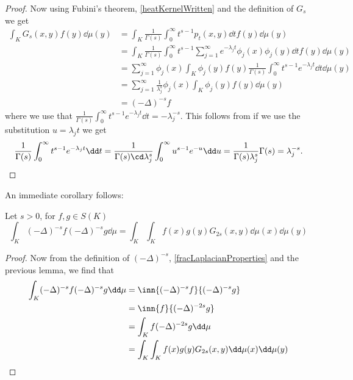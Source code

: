 \begin{proof}
	Now using Fubini's theorem, \cref{heatKernelWritten} and the definition of $G_s$ we get
	\begin{align}
		\int_{K} G_s(x,y) f(y) \dd \mu (y) & = \int_{K} \frac{1}{\Gamma(s)}\int_{0}^{\infty} t^{s-1}p_t(x,y) \dd t f(y)\dd \mu (y) \\
		&= \int_{K} \frac{1}{\Gamma(s)}\int_{0}^{\infty} t^{s-1} \sum_{j = 1}^{\infty} e^{-\lambda_j t} \phi_j(x)\phi_j(y)  \dd t f(y)\dd \mu (y) \\
		&= \sum_{j = 1}^{\infty} \phi_j(x) \int_{K}\phi_{j}(y) f(y)  \frac{1}{\Gamma(s)} \int_{0}^{\infty} t^{s-1}e^{-\lambda_j t} \dd t \dd \mu(y) \\
		&= \sum_{j = 1}^{\infty} \frac{1}{\lambda_{j}^{s}} \phi_j(x) \int_{K}\phi_j(y)f(y) \dd \mu(y) \\
		&= (-\Delta)^{-s}f
 	\end{align}
 	where we use that $\frac{1}{\Gamma(s)} \int_{0}^{\infty} t^{s-1}e^{-\lambda_j t} \dd t  = -\lambda_j^{-s}$. This follows from if we use the substitution $u = \lambda_j t$ we get 
 	\begin{align}
 		\frac{1}{\Gamma(s)} \int_{0}^{\infty} t^{s-1}e^{-\lambda_j t} \dd t = \frac{1}{\Gamma(s) \cd \lambda_j^s} \int_{0}^{\infty} u^{s-1}e^{-u} \dd u = \frac{1}{\Gamma(s)\lambda_{j}^{s}} \Gamma(s) = \lambda_j^{-s}.
  	\end{align}
\end{proof}

An immediate corollary follows:
\begin{coro}\label{coroForRieszKernelAndFractionalLaplacian}
	Let $s > 0$, for $f,g \in S(K)$
	\begin{equation}
		\int_{K} (-\Delta)^{-s} f (-\Delta)^{-s} g \dd \mu = \int_{K}\int_{K} f(x)g(y)G_{2s}(x,y) \dd \mu(x) \dd \mu (y)
 	\end{equation}
\end{coro}
\begin{proof}
	Now from the definition of $(-\Delta)^{-s}$, \cref{fracLaplacianProperties} and the previous lemma, we find that
	\begin{align}
		\int_{K} (-\Delta)^{-s}f (-\Delta)^{-s}g \dd \mu &= \inn{(-\Delta)^{-s}f}{(-\Delta)^{-s}g} \\
		& = \inn{f}{(-\Delta)^{-2s}g}\\
		 & = \int_{K}f (-\Delta)^{-2s}g \dd \mu \\
		 & =\int_{K}\int_{K} f(x)g(y)G_{2s}(x,y) \dd \mu(x) \dd \mu (y)
	\end{align}
\end{proof}